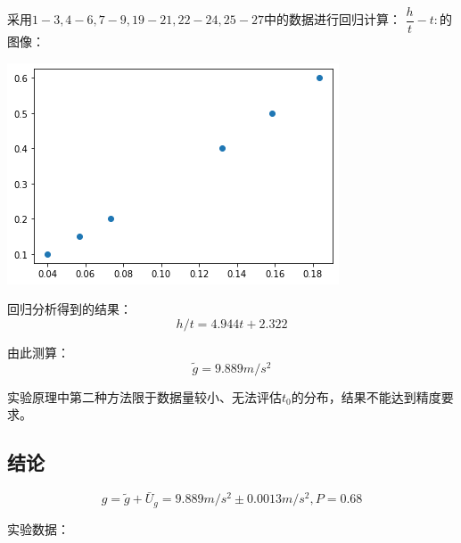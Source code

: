 \documentclass[a4paper]{ltxdoc}
\newenvironment{Figure}
  {\par\medskip\noindent\minipage{\linewidth}}
  {\endminipage\par\medskip}
\begin{document}
\begin{multicols}{2}
    \smallskip
    采用$1-3,4-6,7-9,19-21,22-24,25-27$中的数据进行回归计算：
    $\dfrac h t -t:$的图像：
    \begin{Figure}
        \centering
        \includegraphics[width=\linewidth]{img/output.png}
    \end{Figure}
    回归分析得到的结果：
    $$h/t = 4.944 t + 2.322$$

    由此测算：
    $$\widetilde g=9.889 m/s^2$$

    实验原理中第二种方法限于数据量较小、无法评估$t_0$的分布，结果不能达到精度要求。
    \subsection{结论}
    $$g=\widetilde g + \bar U_g =9.889 m/s^2\pm 0.0013 m/s^2, P=0.68$$
    
    实验数据：


\end{multicols}
\end{document}
